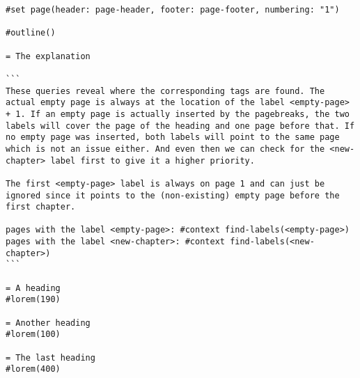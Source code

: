 \begin{verbatim}
#set page(header: page-header, footer: page-footer, numbering: "1")

#outline()

= The explanation

```
These queries reveal where the corresponding tags are found. The actual empty page is always at the location of the label <empty-page> + 1. If an empty page is actually inserted by the pagebreaks, the two labels will cover the page of the heading and one page before that. If no empty page was inserted, both labels will point to the same page which is not an issue either. And even then we can check for the <new-chapter> label first to give it a higher priority.

The first <empty-page> label is always on page 1 and can just be ignored since it points to the (non-existing) empty page before the first chapter.

pages with the label <empty-page>: #context find-labels(<empty-page>)
pages with the label <new-chapter>: #context find-labels(<new-chapter>)
```

= A heading
#lorem(190)

= Another heading
#lorem(100)

= The last heading
#lorem(400)
\end{verbatim}



